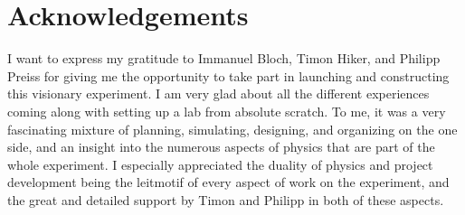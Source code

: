 \chapter*{Acknowledgements}

I want to express my gratitude to Immanuel Bloch, Timon Hiker, and Philipp Preiss for giving me the opportunity to take part in launching and constructing this visionary experiment. I am very glad about all the different experiences coming along with setting up a lab from absolute scratch. To me, it was a very fascinating mixture of planning, simulating, designing, and organizing on the one side, and an insight into the numerous aspects of physics that are part of the whole experiment. I especially appreciated the duality of physics and project development being the leitmotif of every aspect of work on the experiment, and the great and detailed support by Timon and Philipp in both of these aspects.

